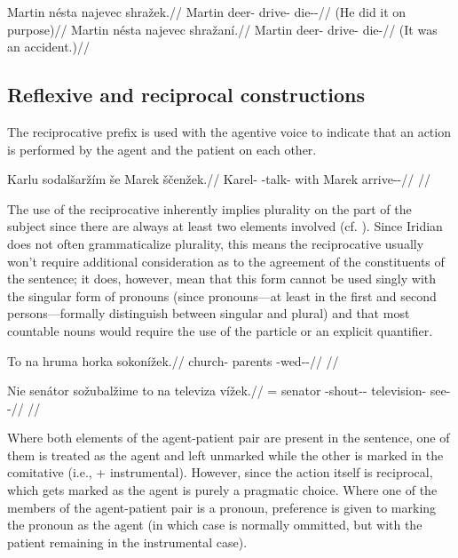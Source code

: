 \pex
\a
\begingl
	\gla Martin nésta najevec shražek.//
	\glb Martin deer-\Acc{} drive-\Cv{} die-\Av{}-\Pf{}//
	\glft {} (He did it on purpose)//
\endgl
\a
\begingl
	\gla Martin nésta najevec shražaní.//
	\glb Martin deer-\Acc{} drive-\Cv{} die-//
	\glft {} (It was an accident.)//
\endgl
\xe

\subsection{Reflexive and reciprocal constructions}

The reciprocative prefix  is used with the agentive voice to indicate that an action is performed by the agent and the patient on each other.

\pex
\begingl
\gla Karlu sodalšar\v{z}ím še Marek ščenžek.//
\glb Karel-\Ins{} \Rec{}-talk- with Marek arrive-\Av{}-\Pf{}//
\glft {}//
\endgl
\xe

The use of the reciprocative inherently implies plurality on the part of the subject since there are always at least two elements involved (cf. \cite[255]{tesniere1965}). Since Iridian does not often grammaticalize plurality, this means the reciprocative usually won't require additional consideration as to the agreement of the constituents of the sentence; it does, however, mean that this form cannot be used singly with the singular form of pronouns (since pronouns---at least in the first and second persons---formally distinguish between singular and plural) and that most countable nouns would require the use of the particle  or an explicit quantifier.

\pex
\begingl
\gla To na hruma horka sokonížek.//
\glb \Dem{} \Loc{} church-\Acc{} parents \Rec{}-wed-\Av{}-\Pf{}//
\glft {}//
\endgl
\xe

\pex
\begingl
\gla Nie senátor sožubal\v{z}ime to na televiza vížek.//
\glb \Pl{}= senator \Rec{}-shout-\Av{}-\Prog{}  \Loc{} television-\Acc{} see-\Av{}-\Pf{}//
\glft {}//
\endgl
\xe

Where both elements of the agent-patient pair are present in the sentence, one of them is treated as the agent and left unmarked while the other is marked in the comitative (i.e.,  + instrumental). However, since the action itself is reciprocal, which gets marked as the agent is purely a pragmatic choice. Where one of the members of the agent-patient pair is a pronoun, preference is given to marking the pronoun as the agent (in which case  is normally ommitted, but with the patient remaining in the instrumental case).

